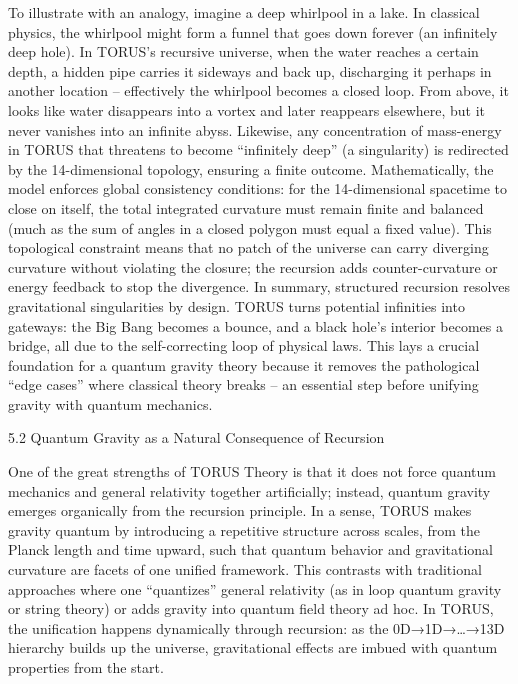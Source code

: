 \documentclass[
]{article}
\begin{document}
To illustrate with an analogy, imagine a deep whirlpool in a lake. In
classical physics, the whirlpool might form a funnel that goes down
forever (an infinitely deep hole). In TORUS's recursive universe, when
the water reaches a certain depth, a hidden pipe carries it sideways and
back up, discharging it perhaps in another location -- effectively the
whirlpool becomes a closed loop. From above, it looks like water
disappears into a vortex and later reappears elsewhere, but it never
vanishes into an infinite abyss. Likewise, any concentration of
mass-energy in TORUS that threatens to become ``infinitely deep'' (a
singularity) is redirected by the 14-dimensional topology, ensuring a
finite outcome. Mathematically, the model enforces global consistency
conditions: for the 14-dimensional spacetime to close on itself, the
total integrated curvature must remain finite and balanced (much as the
sum of angles in a closed polygon must equal a fixed value). This
topological constraint means that no patch of the universe can carry
diverging curvature without violating the closure; the recursion adds
counter-curvature or energy feedback to stop the divergence. In summary,
structured recursion resolves gravitational singularities by design.
TORUS turns potential infinities into gateways: the Big Bang becomes a
bounce, and a black hole's interior becomes a bridge, all due to the
self-correcting loop of physical laws. This lays a crucial foundation
for a quantum gravity theory because it removes the pathological ``edge
cases'' where classical theory breaks -- an essential step before
unifying gravity with quantum mechanics.

5.2 Quantum Gravity as a Natural Consequence of Recursion

One of the great strengths of TORUS Theory is that it does not force
quantum mechanics and general relativity together artificially; instead,
quantum gravity emerges organically from the recursion principle. In a
sense, TORUS makes gravity quantum by introducing a repetitive structure
across scales, from the Planck length and time upward, such that quantum
behavior and gravitational curvature are facets of one unified
framework. This contrasts with traditional approaches where one
``quantizes'' general relativity (as in loop quantum gravity or string
theory) or adds gravity into quantum field theory ad hoc. In TORUS, the
unification happens dynamically through recursion: as the
0D→1D→\ldots→13D hierarchy builds up the universe, gravitational effects
are imbued with quantum properties from the start.
\end{document}
